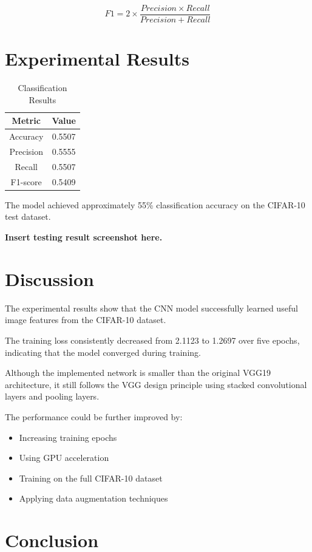 \documentclass[12pt]{article}
\begin{document}
\[
F1 = 2 \times \frac{Precision \times Recall}{Precision + Recall}
\]

\section{Experimental Results}

\begin{table}[H]
\centering
\begin{tabular}{cc}
\toprule
Metric & Value \\
\midrule
Accuracy & 0.5507 \\
Precision & 0.5555 \\
Recall & 0.5507 \\
F1-score & 0.5409 \\
\bottomrule
\end{tabular}
\caption{Classification Results}
\end{table}

The model achieved approximately 55\% classification accuracy on the CIFAR-10 test dataset.

\textbf{Insert testing result screenshot here.}

\section{Discussion}

The experimental results show that the CNN model successfully learned useful image features from the CIFAR-10 dataset.

The training loss consistently decreased from 2.1123 to 1.2697 over five epochs, indicating that the model converged during training.

Although the implemented network is smaller than the original VGG19 architecture, it still follows the VGG design principle using stacked convolutional layers and pooling layers.

The performance could be further improved by:

\begin{itemize}
    \item Increasing training epochs
    \item Using GPU acceleration
    \item Training on the full CIFAR-10 dataset
    \item Applying data augmentation techniques
\end{itemize}

\section{Conclusion}
\end{document}
